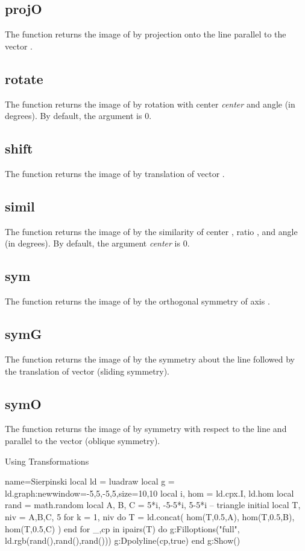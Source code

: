 \subsection{projO}
The function  returns the image of  by projection onto the line  parallel to the vector .

\subsection{rotate}
The function  returns the image of  by rotation with center \emph{center} and angle  (in degrees). By default, the argument  is $0$.

\subsection{shift}
The function  returns the image of  by translation of vector .

\subsection{simil}
The function  returns the image of  by the similarity of center , ratio , and angle  (in degrees). By default, the argument \emph{center} is $0$.

\subsection{sym}
The function  returns the image of  by the orthogonal symmetry of axis .

\subsection{symG}
The function  returns the image of  by the symmetry about the line  followed by the translation of vector  (sliding symmetry).

\subsection{symO}
The function  returns the image of  by symmetry with respect to the line  and parallel to the vector  (oblique symmetry).

\begin{demo}{Using Transformations}
\begin{luadraw}{name=Sierpinski}
local ld = luadraw
local g = ld.graph:new{window={-5,5,-5,5},size={10,10}}
local i, hom = ld.cpx.I, ld.hom
local rand = math.random
local A, B, C = 5*i, -5-5*i, 5-5*i -- triangle initial
local T, niv = {{A,B,C}}, 5
for k = 1, niv do
    T = ld.concat( hom(T,0.5,A), hom(T,0.5,B), hom(T,0.5,C) )
end
for _,cp in ipairs(T) do
    g:Filloptions("full", ld.rgb(rand(),rand(),rand()))
    g:Dpolyline(cp,true)
end
g:Show()
\end{luadraw}
\end{demo}
